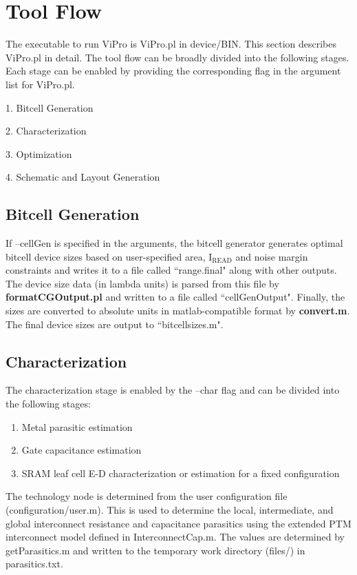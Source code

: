 \section{Tool Flow}
\label{RVP}
The executable to run ViPro is ViPro.pl in device/BIN. This section describes ViPro.pl in detail. The tool flow can be broadly divided into the following stages. Each stage can be enabled by providing the corresponding flag in the argument list for ViPro.pl.

1. Bitcell Generation

2. Characterization

3. Optimization

4. Schematic and Layout Generation

\subsection{Bitcell Generation}
If --cellGen is specified in the arguments, the bitcell generator generates optimal bitcell device sizes based on user-specified area, I$_\text{READ}$ and noise margin constraints and writes it to a file called ``range.final" along with other outputs. The device size data (in lambda units) is parsed from this file by \textbf{formatCGOutput.pl} and written to a file called ``cellGenOutput". Finally, the sizes are converted to absolute units in matlab-compatible format by \textbf{convert.m}. The final device sizes are output to ``bitcellsizes.m".

\subsection{Characterization}
The characterization stage is enabled by the --char flag and can be divided into the following stages:
\begin{enumerate}
\setlength{\itemsep}{0cm}
\setlength{\parskip}{0cm}
\item Metal parasitic estimation
\item Gate capacitance estimation
\item SRAM leaf cell E-D characterization or estimation for a fixed configuration 
\end{enumerate}

The technology node is determined from the user configuration file (configuration/user.m). This is used to determine the local, intermediate, and global interconnect resistance and capacitance parasitics using the extended PTM interconnect model defined in InterconnectCap.m. The values are determined by getParasitics.m and written to the temporary work directory (files/) in parasitics.txt.

